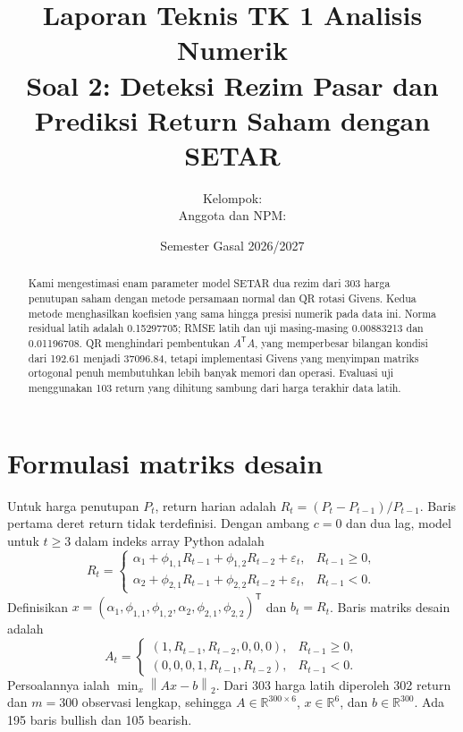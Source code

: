 \documentclass[11pt,a4paper]{article}
\title{Laporan Teknis TK 1 Analisis Numerik\\[3pt]
\large Soal 2: Deteksi Rezim Pasar dan Prediksi Return Saham dengan SETAR}
\author{Kelompok: \underline{\hspace{4cm}}\\[5pt]
Anggota dan NPM: \underline{\hspace{8cm}}}
\date{Semester Gasal 2026/2027}
\newcommand{\R}{\mathbb{R}}
\newcommand{\norm}[1]{\left\lVert #1\right\rVert_2}
\begin{document}
\maketitle
\begin{center}
\end{center}

\begin{abstract}
Kami mengestimasi enam parameter model SETAR dua rezim dari 303 harga penutupan saham dengan metode persamaan normal dan QR rotasi Givens. Kedua metode menghasilkan koefisien yang sama hingga presisi numerik pada data ini. Norma residual latih adalah 0.15297705; RMSE latih dan uji masing-masing 0.00883213 dan 0.01196708. QR menghindari pembentukan $A^\mathsf{T}A$, yang memperbesar bilangan kondisi dari 192.61 menjadi 37096.84, tetapi implementasi Givens yang menyimpan matriks ortogonal penuh membutuhkan lebih banyak memori dan operasi. Evaluasi uji menggunakan 103 return yang dihitung sambung dari harga terakhir data latih.
\end{abstract}

\section{Formulasi matriks desain}
Untuk harga penutupan $P_t$, return harian adalah $R_t=(P_t-P_{t-1})/P_{t-1}$. Baris pertama deret return tidak terdefinisi. Dengan ambang $c=0$ dan dua lag, model untuk $t\geq3$ dalam indeks array Python adalah
\begin{equation}
R_t=\begin{cases}
\alpha_1+\phi_{1,1}R_{t-1}+\phi_{1,2}R_{t-2}+\varepsilon_t,& R_{t-1}\geq0,\\
\alpha_2+\phi_{2,1}R_{t-1}+\phi_{2,2}R_{t-2}+\varepsilon_t,& R_{t-1}<0.
\end{cases}
\end{equation}
Definisikan $x=(\alpha_1,\phi_{1,1},\phi_{1,2},\alpha_2,\phi_{2,1},\phi_{2,2})^\mathsf{T}$ dan $b_t=R_t$. Baris matriks desain adalah
\[
A_t=\begin{cases}
(1,R_{t-1},R_{t-2},0,0,0),&R_{t-1}\geq0,\\
(0,0,0,1,R_{t-1},R_{t-2}),&R_{t-1}<0.
\end{cases}
\]
Persoalannya ialah $\min_x\norm{Ax-b}$. Dari 303 harga latih diperoleh 302 return dan $m=300$ observasi lengkap, sehingga $A\in\R^{300\times6}$, $x\in\R^6$, dan $b\in\R^{300}$. Ada 195 baris bullish dan 105 bearish.
\end{document}
